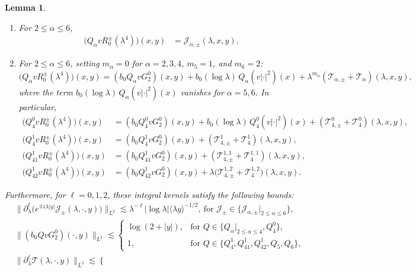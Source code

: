 \documentclass[reqno]{amsart}
\newtheorem{lemma}[theorem]{Lemma}
\numberwithin{equation}{section}
\begin{document}
\begin{lemma}
\begin{enumerate}
		\item[(ii)] For $2\le\alpha\le6$, 
		\begin{align*}
		\bigl(Q_\alpha v R_0^\pm(\lambda^4)\bigr)(x,y)&=\mathcal{J}_{\alpha, \pm} (\lambda,x,y).
		\end{align*}
		\item[(iii)] For $2\le\alpha\le6$,
		setting $m_\alpha=0$ for $\alpha=2,3,4$, $m_5=1$, and $m_6=2$:
		$$
			\bigl(Q_\alpha v R_0^\pm(\lambda^4)\bigr)(x,y) =(b_0Q_\alpha v G_2^0)(x,y)+b_0(\log\lambda)\,Q_\alpha(v|\cdot|^2)(x)+ \lambda^{m_\alpha} (\mathcal{T}_{\alpha, \pm} + \mathcal{T}_\alpha)(\lambda, x, y),
        $$
		where the term $b_0 (\log\lambda) \, Q_\alpha(v|\cdot|^2)(x)$ vanishes
        for $\alpha=5,6$.
		In particular,
		\begin{align*}
\bigl(Q_4^0 v R_0^\pm(\lambda^4)\bigr)(x,y) &=(b_0Q_4^0 v G_2^0)(x,y)+b_0(\log\lambda)\,Q_4^0(v|\cdot|^2)(x)+(\mathcal{T}_{4,\pm}^0+\mathcal{T}_4^0)(\lambda,x,y),\\
\bigl(Q_4^1 v R_0^\pm(\lambda^4)\bigr)(x,y) &=(b_0Q_4^1 v G_2^0)(x,y)+(\mathcal{T}_{4,\pm}^1+\mathcal{T}_4^1)(\lambda,x,y),\\
\bigl(Q_{41}^1  v R_0^\pm(\lambda^4)\bigr)(x,y) &=(b_0Q_{41}^1  v G_2^0)(x,y)+(\mathcal{T}_{4,\pm}^{1,1}+\mathcal{T}_4^{1,1})(\lambda,x,y),\\
\bigl(Q_{42}^1  v R_0^\pm(\lambda^4)\bigr)(x,y) &=(b_0Q_{42}^1  v G_2^0)(x,y)+\lambda\bigl(\mathcal{T}_{4,\pm}^{1,2}+\mathcal{T}_4^{1,2})(\lambda,x,y).
		\end{align*}
	\end{enumerate}
	Furthermore, for $\ell=0,1,2$, these integral kernels satisfy the following bounds:
	\begin{align}\label{J}
		&\|\partial_\lambda^\ell\big(e^{\mp i\lambda|y|}\mathcal{J}_{\pm}(\lambda,\cdot,y)\big)\|_{L^2} \lesssim\lambda^{-\ell}|\log\lambda|\langle\lambda y\rangle^{-1/2},\  \text{for } \mathcal{J}_{\pm} \in \{\mathcal{J}_{\alpha,\pm}|_{2\le\alpha\le6}\},\\
&\bigl\|(b_0Q v G_2^0)(\cdot,y)\bigr\|_{L^2} \lesssim
		\begin{cases}
		\log(2+|y|), & \text{for } Q \in \{Q_\alpha|_{2 \le \alpha \le 4}, Q_4^0\}, \\[2pt]
		1, & \text{for } Q \in \{Q_4^1, Q_{41}^1, Q_{42}^1, Q_5, Q_6\},
		\end{cases} \label{lemma_projection_G} \\
&\|\partial_\lambda^\ell\mathcal{T}(\lambda,\cdot,y)\|_{L^2} \lesssim
		\begin{cases}

\end{cases}
\end{align}
\end{lemma}
\end{document}
